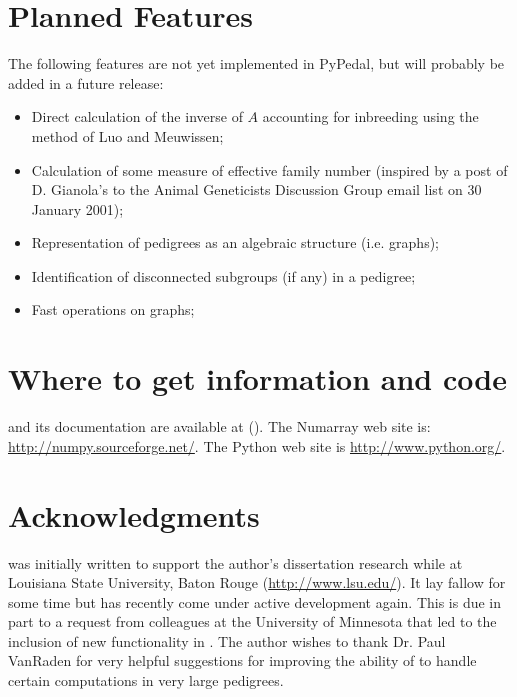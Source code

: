 \section{Planned Features}
The following features are not yet implemented in PyPedal, but will probably be added in a future release:
\begin{itemize}
\item Direct calculation of the inverse of $A$ accounting for inbreeding using the method of Luo and Meuwissen;
\item Calculation of some measure of effective family number (inspired by a post of D. Gianola's to the Animal Geneticists Discussion Group email list on 30 January 2001);
\item Representation of pedigrees as an algebraic structure (i.e. graphs);
\item Identification of disconnected subgroups (if any) in a pedigree;
\item Fast operations on graphs;
\end{itemize}

\section{Where to get information and code}
\PYPEDAL{} and its documentation are available at (). The Numarray web site is: \url{http://numpy.sourceforge.net/}. The Python web site is \url{http://www.python.org/}.

\section{Acknowledgments}
\PYPEDAL{} was initially written to support the author's dissertation research while at Louisiana State University, Baton Rouge (\url{http://www.lsu.edu/}).  It lay fallow for some time but has recently come under active development again.  This is due in part to a request from colleagues at the University of Minnesota that led to the inclusion of new functionality in \PYPEDAL{}.  The author wishes to thank Dr. Paul Van{R}aden for very helpful suggestions for improving the ability of \PYPEDAL{} to handle certain computations in very large pedigrees.